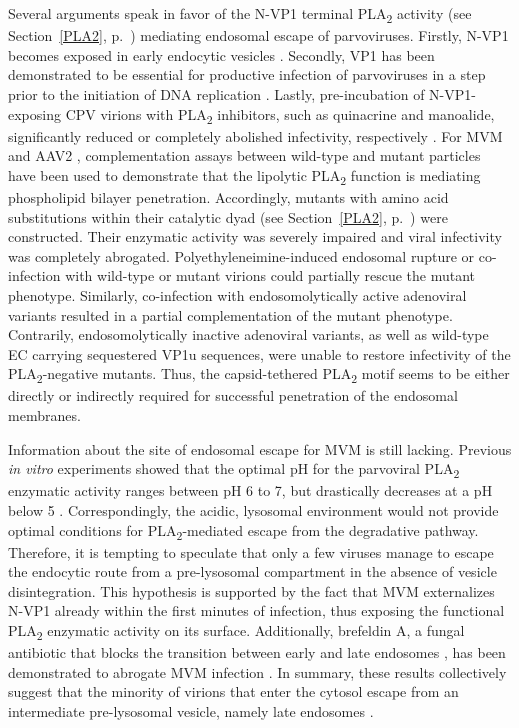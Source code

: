Several arguments speak in favor of the N-VP1 terminal PLA\textsubscript{2} activity (see Section~\ref{PLA2}, p.~\pageref{PLA2}) mediating endosomal escape of parvoviruses. Firstly, N-VP1 becomes exposed in early endocytic vesicles \cite{pmid16379002, pmid14644609, pmid9927584, pmid16284249, pmid11961250, pmid20974479, pmid11702787}. Secondly, VP1 has been demonstrated to be essential for productive infection of parvoviruses in a step prior to the initiation of DNA replication \cite{pmid8416366, pmid10684294, pmid1733094, pmid11160681, pmid11287557, pmid10644365, pmid12438589, pmid9420290}. Lastly, pre-incubation of N-VP1-exposing CPV virions with PLA\textsubscript{2} inhibitors, such as quinacrine and manoalide, significantly reduced or completely abolished infectivity, respectively \cite{pmid14644609}. For MVM \cite{pmid16284249} and AAV2 \cite{pmid20974479}, complementation assays between wild-type and mutant particles have been used to demonstrate that the lipolytic PLA\textsubscript{2} function is mediating phospholipid bilayer penetration. Accordingly, mutants with amino acid substitutions within their catalytic dyad (see Section~\ref{PLA2}, p.~\pageref{PLA2}) were constructed. Their enzymatic activity was severely impaired and viral infectivity was completely abrogated. Polyethyleneimine-induced endosomal rupture or co-infection with wild-type or mutant virions could partially rescue the mutant phenotype. Similarly, co-infection with endosomolytically active adenoviral variants resulted in a partial complementation of the mutant phenotype. Contrarily, endosomolytically inactive adenoviral variants, as well as wild-type EC carrying sequestered VP1u sequences, were unable to restore infectivity of the PLA\textsubscript{2}-negative mutants. Thus, the capsid-tethered PLA\textsubscript{2} motif seems to be either directly or indirectly required for successful penetration of the endosomal membranes.  

Information about the site of endosomal escape for MVM is still lacking. Previous \textit{in vitro} experiments showed that the optimal pH for the parvoviral PLA\textsubscript{2} enzymatic activity ranges between pH 6 to 7, but drastically decreases at a pH below 5 \cite{pmid14726513}. Correspondingly, the acidic, lysosomal environment would not provide optimal conditions for PLA\textsubscript{2}-mediated escape from the degradative pathway. Therefore, it is tempting to speculate that only a few viruses manage to escape the endocytic route from a pre-lysosomal compartment in the absence of vesicle disintegration. This hypothesis is supported by the fact that MVM externalizes N-VP1 already within the first minutes of infection, thus exposing the functional PLA\textsubscript{2} enzymatic activity on its surface. Additionally, brefeldin A, a fungal antibiotic that blocks the transition between early and late endosomes \cite{pmid1682055}, has been demonstrated to abrogate MVM infection \cite{pmid12438589}. In summary, these results collectively suggest that the minority of virions that enter the cytosol escape from an intermediate pre-lysosomal vesicle, namely late endosomes \cite{pmid16379002}.

